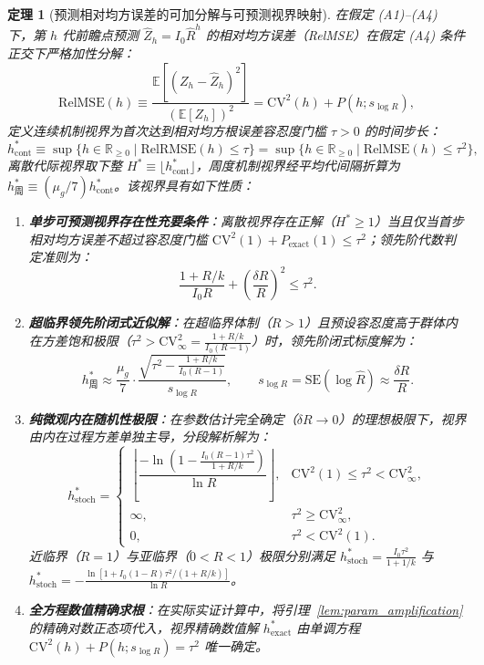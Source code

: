 \documentclass[10pt,a4paper]{article}
\theoremstyle{plain}
\newtheorem{theorem}{定理}
\theoremstyle{definition}
\begin{document}
\begin{theorem}[预测相对均方误差的可加分解与可预测视界映射]\label{thm:horizon}
在假定 (A1)--(A4) 下，第 $h$ 代前瞻点预测 $\hat{Z}_h = I_0 \hat{R}^h$ 的相对均方误差（RelMSE）在假定 (A4) 条件正交下严格加性分解：
\begin{equation}
\text{RelMSE}(h) \equiv \frac{\mathbb{E}[(Z_h - \hat{Z}_h)^2]}{(\mathbb{E}[Z_h])^2} = \text{CV}^2(h) + P(h; s_{\log R}),
\label{eq:relmse_decomp}
\end{equation}
定义连续机制视界为首次达到相对均方根误差容忍度门槛 $\tau > 0$ 的时间步长：
\begin{equation}
h^*_{\text{cont}} \equiv \sup\{h \in \mathbb{R}_{\ge 0} \mid \text{RelRMSE}(h) \le \tau\} = \sup\{h \in \mathbb{R}_{\ge 0} \mid \text{RelMSE}(h) \le \tau^2\},
\end{equation}
离散代际视界取下整 $H^* \equiv \lfloor h^*_{\text{cont}} \rfloor$，周度机制视界经平均代间隔折算为 $h^*_{\text{周}} \equiv (\mu_g/7) h^*_{\text{cont}}$。该视界具有如下性质：
\begin{enumerate}
\item \textbf{单步可预测视界存在性充要条件}：离散视界存在正解（$H^* \ge 1$）当且仅当首步相对均方误差不超过容忍度门槛 $\text{CV}^2(1) + P_{\text{exact}}(1) \le \tau^2$；领先阶代数判定准则为：
\begin{equation}
\frac{1 + R/k}{I_0 R} + \left(\frac{\delta R}{R}\right)^2 \le \tau^2.
\label{eq:h_exist_cond}
\end{equation}
\item \textbf{超临界领先阶闭式近似解}：在超临界体制（$R > 1$）且预设容忍度高于群体内在方差饱和极限（$\tau^2 > \text{CV}^2_\infty = \frac{1+R/k}{I_0(R-1)}$）时，领先阶闭式标度解为：
\begin{equation}
h^*_{\text{周}} \approx \frac{\mu_g}{7} \cdot \frac{\sqrt{\tau^2 - \frac{1 + R/k}{I_0(R - 1)}}}{s_{\log R}}, \qquad s_{\log R} = \text{SE}(\log \hat{R}) \approx \frac{\delta R}{R}.
\label{eq:horizon_cn}
\end{equation}
\item \textbf{纯微观内在随机性极限}：在参数估计完全确定（$\delta R \to 0$）的理想极限下，视界由内在过程方差单独主导，分段解析解为：
\begin{equation}
h^*_{\text{stoch}} = \begin{cases}
\left\lfloor \dfrac{-\ln\left(1 - \frac{I_0(R - 1)\tau^2}{1 + R/k}\right)}{\ln R} \right\rfloor, & \text{CV}^2(1) \le \tau^2 < \text{CV}^2_\infty, \\[6pt]
\infty, & \tau^2 \ge \text{CV}^2_\infty, \\[4pt]
0, & \tau^2 < \text{CV}^2(1).
\end{cases}
\label{eq:h_stoch_bound}
\end{equation}
近临界（$R=1$）与亚临界（$0<R<1$）极限分别满足 $h^*_{\text{stoch}} = \frac{I_0\tau^2}{1+1/k}$ 与 $h^*_{\text{stoch}} = -\frac{\ln[1+I_0(1-R)\tau^2/(1+R/k)]}{\ln R}$。
\item \textbf{全方程数值精确求根}：在实际实证计算中，将引理~\ref{lem:param_amplification} 的精确对数正态项代入，视界精确数值解 $h^*_{\text{exact}}$ 由单调方程 $\text{CV}^2(h) + P(h; s_{\log R}) = \tau^2$ 唯一确定。
\end{enumerate}
\end{theorem}
\end{document}
